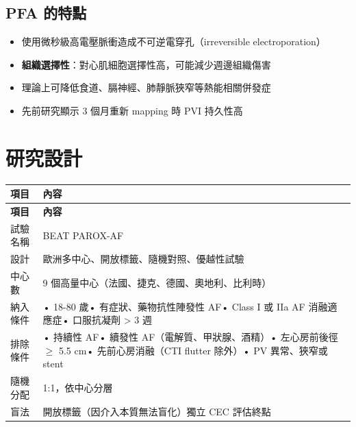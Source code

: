 \documentclass[12pt,a4paper]{article}
\begin{document}
\subsection{PFA 的特點}

\begin{itemize}
    \item 使用微秒級高電壓脈衝造成不可逆電穿孔（irreversible electroporation）
    \item \textbf{組織選擇性}：對心肌細胞選擇性高，可能減少週邊組織傷害
    \item 理論上可降低食道、膈神經、肺靜脈狹窄等熱能相關併發症
    \item 先前研究顯示 3 個月重新 mapping 時 PVI 持久性高
\end{itemize}

\section{研究設計}

\begin{longtable}{p{4cm}p{10cm}}
\toprule
\textbf{項目} & \textbf{內容} \\
\midrule
\endfirsthead
\midrule
\textbf{項目} & \textbf{內容} \\
\midrule
\endhead
\bottomrule
\endfoot
試驗名稱 & BEAT PAROX-AF \\
\midrule
設計 & 歐洲多中心、開放標籤、隨機對照、優越性試驗 \\
\midrule
中心數 & 9 個高量中心（法國、捷克、德國、奧地利、比利時）\\
\midrule
納入條件 & • 18-80 歲\newline • 有症狀、藥物抗性陣發性 AF\newline • Class I 或 IIa AF 消融適應症\newline • 口服抗凝劑 > 3 週 \\
\midrule
排除條件 & • 持續性 AF\newline • 續發性 AF（電解質、甲狀腺、酒精）\newline • 左心房前後徑 $\geq$ 5.5 cm\newline • 先前心房消融（CTI flutter 除外）\newline • PV 異常、狹窄或 stent \\
\midrule
隨機分配 & 1:1，依中心分層 \\
\midrule
盲法 & 開放標籤（因介入本質無法盲化）\newline 獨立 CEC 評估終點 \\
\bottomrule
\end{longtable}
\end{document}
